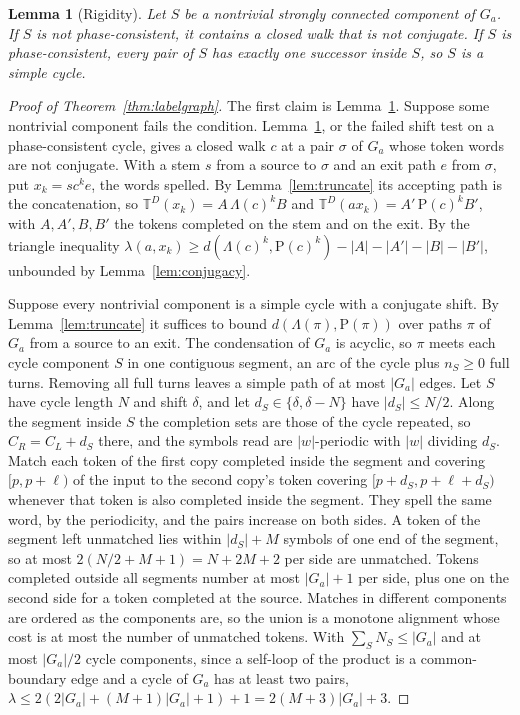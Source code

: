 \documentclass[11pt,a4paper]{article}
\theoremstyle{definition}
\theoremstyle{plain}
\newtheorem{lemma}{Lemma}
\newcommand{\T}{\mathbb{T}}
\begin{document}
\begin{lemma}[Rigidity]\label{lem:rigid}
Let \(S\) be a nontrivial strongly connected component of \(G_a\). If \(S\) is not phase-consistent, it contains a
closed walk that is not conjugate. If \(S\) is phase-consistent, every pair of \(S\) has exactly one successor inside
\(S\), so \(S\) is a simple cycle.
\end{lemma}

\begin{proof}[Proof of Theorem~\ref{thm:labelgraph}]
The first claim is Lemma~\ref{lem:rigid}. Suppose some nontrivial component fails the condition. Lemma~\ref{lem:rigid},
or the failed shift test on a phase-consistent cycle, gives a closed walk \(c\) at a pair \(\sigma\) of \(G_a\) whose
token words are not conjugate. With a stem \(s\) from a source to \(\sigma\) and an exit path \(e\) from \(\sigma\), put
\(x_k = s c^k e\), the words spelled. By Lemma~\ref{lem:truncate} its accepting path is the concatenation, so
\(\T^D(x_k) = A\,\Lambda(c)^k B\) and \(\T^D(a x_k) = A'\,\mathrm{P}(c)^k B'\), with \(A, A', B, B'\) the tokens
completed on the stem and on the exit. By the triangle inequality
\(\lambda(a, x_k) \ge d(\Lambda(c)^k, \mathrm{P}(c)^k) - |A| - |A'| - |B| - |B'|\), unbounded by
Lemma~\ref{lem:conjugacy}.

Suppose every nontrivial component is a simple cycle with a conjugate shift. By Lemma~\ref{lem:truncate} it suffices to
bound \(d(\Lambda(\pi), \mathrm{P}(\pi))\) over paths \(\pi\) of \(G_a\) from a source to an exit. The condensation of
\(G_a\) is acyclic, so \(\pi\) meets each cycle component \(S\) in one contiguous segment, an arc of the cycle plus
\(n_S \ge 0\) full turns. Removing all full turns leaves a simple path of at most \(|G_a|\) edges. Let \(S\) have cycle
length \(N\) and shift \(\delta\), and let \(d_S \in \{\delta, \delta - N\}\) have \(|d_S| \le N/2\). Along the segment
inside \(S\) the completion sets are those of the cycle repeated, so \(C_R = C_L + d_S\) there, and the symbols read are
\(|w|\)-periodic with \(|w|\) dividing \(d_S\). Match each token of the first copy completed inside the segment and
covering \([p, p + \ell)\) of the input to the second copy's token covering \([p + d_S, p + \ell + d_S)\) whenever that
token is also completed inside the segment. They spell the same word, by the periodicity, and the pairs increase on both
sides. A token of the segment left unmatched lies within \(|d_S| + M\) symbols of one end of the segment, so at most
\(2(N/2 + M + 1) = N + 2M + 2\) per side are unmatched. Tokens completed outside all segments number at most
\(|G_a| + 1\) per side, plus one on the second side for a token completed at the source. Matches in different components
are ordered as the components are, so the union is a monotone alignment whose cost is at most the number of unmatched
tokens. With \(\sum_S N_S \le |G_a|\) and at most \(|G_a|/2\) cycle components, since a self-loop of the product is a
common-boundary edge and a cycle of \(G_a\) has at least two pairs,
\(\lambda \le 2(2|G_a| + (M + 1)|G_a| + 1) + 1 = 2(M + 3)|G_a| + 3\).


\end{proof}
\end{document}
